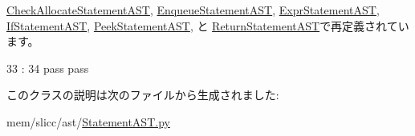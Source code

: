 \hyperlink{classslicc_1_1ast_1_1CheckAllocateStatementAST_1_1CheckAllocateStatementAST_abd195c795639b490ba2de4c1246105f1}{CheckAllocateStatementAST}, \hyperlink{classslicc_1_1ast_1_1EnqueueStatementAST_1_1EnqueueStatementAST_abd195c795639b490ba2de4c1246105f1}{EnqueueStatementAST}, \hyperlink{classslicc_1_1ast_1_1ExprStatementAST_1_1ExprStatementAST_abd195c795639b490ba2de4c1246105f1}{ExprStatementAST}, \hyperlink{classslicc_1_1ast_1_1IfStatementAST_1_1IfStatementAST_abd195c795639b490ba2de4c1246105f1}{IfStatementAST}, \hyperlink{classslicc_1_1ast_1_1PeekStatementAST_1_1PeekStatementAST_abd195c795639b490ba2de4c1246105f1}{PeekStatementAST}, と \hyperlink{classslicc_1_1ast_1_1ReturnStatementAST_1_1ReturnStatementAST_abd195c795639b490ba2de4c1246105f1}{ReturnStatementAST}で再定義されています。


\begin{DoxyCode}
33                                       :
34         pass
        pass
\end{DoxyCode}


このクラスの説明は次のファイルから生成されました:\begin{DoxyCompactItemize}
\item 
mem/slicc/ast/\hyperlink{StatementAST_8py}{StatementAST.py}\end{DoxyCompactItemize}
